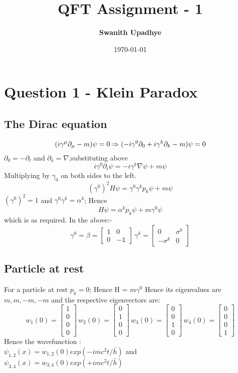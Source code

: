 \documentclass[11pt]{article}
\title{QFT Assignment - 1}
\author{\textbf{\Large Swanith Upadhye}}
\date{\today}
\begin{document}
	
	\maketitle
	\Large
	
	\section*{\color{teal} Question 1 - Klein Paradox}
	
	\subsection{The Dirac equation} 
	\[
		(i\gamma^\mu \partial_\mu - m)\psi = 0\\
		\Rightarrow (-i\gamma^0\partial_0 + i\gamma^k \partial_k - m)\psi =0
	\]
	\(\partial_0 = -\partial_t\) and \(\partial_k = \nabla\);substituting above
	\[
		i\gamma^0\partial_t\psi = -i\gamma^k\nabla\psi +m\psi
	\]
	Multiplying by \(\gamma_0\) on both sides to the left.
	\[
		(\gamma^0)^2 H\psi = \gamma^0\gamma^k p_k\psi + m\psi
	\]
	\((\gamma^0)^2=1\) and \(\gamma^0\gamma^k = \alpha^k\); Hence
	\[
		H\psi = \alpha^k p_k\psi + m\gamma^0\psi
	\]which is as required.
	In the above:-
	\[
		\gamma^0 = \beta = \begin{bmatrix}\mathbb{1} & 0 \\0 &-\mathbb{1} \end{bmatrix}\,
		 \gamma^k = \begin{bmatrix}0 & \mathbb{\sigma}^k \\-\mathbb{\sigma}^k & 0 \end{bmatrix}
	\]
	
	\subsection{Particle at rest}
	For a particle at rest \(p_k = 0\); Hence H = \(m\gamma^0\)
	Hence its eigenvalues are \({m,m,-m,-m}\) and the respective eigenvectors are:
	\[
		w_1(0)=\begin{bmatrix} 1\\0\\0\\0\end{bmatrix} \, w_2(0)=\begin{bmatrix} 0\\1\\0\\0\end{bmatrix} \, w_3(0)=\begin{bmatrix} 0\\0\\1\\0\end{bmatrix} \, w_4(0)=\begin{bmatrix} 0\\0\\0\\1\end{bmatrix}
	\]
	Hence the wavefunction :\\
	 \(\psi_{1,2}(x)= w_{1,2}(0)exp(-imc^2t/\bar{h})\)  and  \(\psi_{3,4}(x)= w_{3,4}(0)exp(+imc^2t/\bar{h})\)
	 
\end{document}
